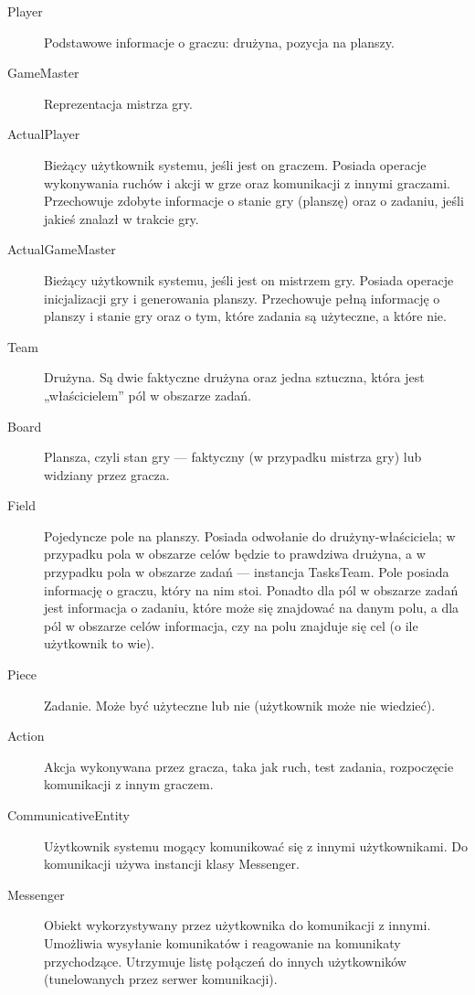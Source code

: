 \documentclass[11pt]{article}
\begin{document}
\begin{description}
	\item[Player] Podstawowe informacje o graczu: drużyna, pozycja na planszy.

	\item[GameMaster] Reprezentacja mistrza gry.

	\item[ActualPlayer] Bieżący użytkownik systemu, jeśli jest on graczem. Posiada operacje wykonywania ruchów i akcji w grze oraz komunikacji z innymi graczami. Przechowuje zdobyte informacje o stanie gry (planszę) oraz o zadaniu, jeśli jakieś znalazł w trakcie gry.

	\item[ActualGameMaster] Bieżący użytkownik systemu, jeśli jest on mistrzem gry. Posiada operacje inicjalizacji gry i generowania planszy. Przechowuje pełną informację o planszy i stanie gry oraz o tym, które zadania są użyteczne, a które nie.

	\item[Team] Drużyna. Są dwie faktyczne drużyna oraz jedna sztuczna, która jest „właścicielem” pól w obszarze zadań.

	\item[Board] Plansza, czyli stan gry --- faktyczny (w przypadku mistrza gry) lub widziany przez gracza.

	\item[Field] Pojedyncze pole na planszy. Posiada odwołanie do drużyny-właściciela; w przypadku pola w obszarze celów będzie to prawdziwa drużyna, a w przypadku pola w obszarze zadań --- instancja TasksTeam. Pole posiada informację o graczu, który na nim stoi. Ponadto dla pól w obszarze zadań jest informacja o zadaniu, które może się znajdować na danym polu, a dla pól w obszarze celów informacja, czy na polu znajduje się cel (o ile użytkownik to wie).

	\item[Piece] Zadanie. Może być użyteczne lub nie (użytkownik może nie wiedzieć).

	\item[Action] Akcja wykonywana przez gracza, taka jak ruch, test zadania, rozpoczęcie komunikacji z innym graczem.

	\item[CommunicativeEntity] Użytkownik systemu mogący komunikować się z innymi użytkownikami. Do komunikacji używa instancji klasy Messenger.

	\item[Messenger] Obiekt wykorzystywany przez użytkownika do komunikacji z innymi. Umożliwia wysyłanie komunikatów i reagowanie na komunikaty przychodzące. Utrzymuje listę połączeń do innych użytkowników (tunelowanych przez serwer komunikacji).


\end{description}
\end{document}
